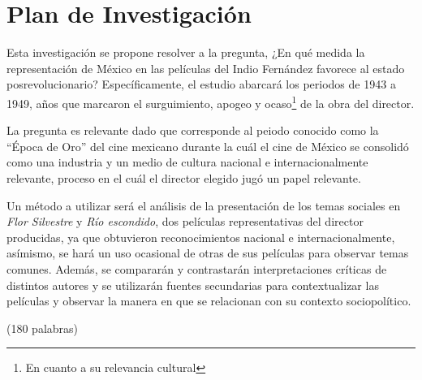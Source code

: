 \section{Plan de Investigación}
Esta investigación se propone resolver a la pregunta,
¿En qué medida la representación de México en las películas del Indio Fernández favorece al estado posrevolucionario? Específicamente, el estudio abarcará los periodos de 1943 a 1949, años que marcaron el surguimiento, apogeo y ocaso\footnote{En cuanto a su relevancia cultural} de la obra del director\autocite[133]{mora_mexican_1978-2}.

La pregunta es relevante dado que corresponde al peiodo conocido como la ``Época de Oro'' del cine mexicano durante la cuál el cine de México se consolidó como una industria y un medio de cultura nacional e internacionalmente relevante, proceso en el cuál el director elegido jugó un papel relevante\autocite[133]{mora_mexican_1978-2}.

Un método a utilizar será el análisis de la presentación de los temas sociales en \emph{Flor Silvestre} y  \emph{Río escondido}, dos películas representativas del director producidas, ya que obtuvieron reconocimientos nacional e internacionalmente, asímismo, se hará un uso ocasional de otras de sus películas para observar temas comunes. Además, se compararán y contrastarán interpretaciones críticas de distintos autores y se utilizarán fuentes secundarias para contextualizar las películas y observar la manera en que se relacionan con su contexto sociopolítico. 

(180 palabras)
\pagebreak

